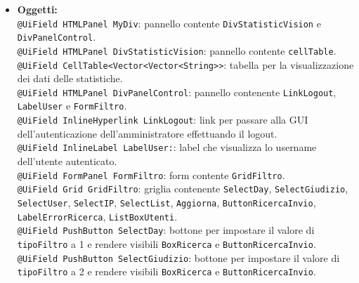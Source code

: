 {\begin{sloppypar}
{{{\begin{itemize}
					\texttt{- CellList<ContactInfo> cellList}: identifica l'oggetto che contiene la lista degli utenti registrati.\\
					
					\texttt{- String selected}: string che identifica l'utente attualmente selezionato.\\
				
				\item[] \textbf{Oggetti:}\\
					\texttt{@UiField HTMLPanel MyDiv}: pannello contente \texttt{DivStatisticVision} e \texttt{DivPanelControl}.\\

					\texttt{@UiField HTMLPanel DivStatisticVision}: pannello contente \texttt{cellTable}.\\

					\texttt{@UiField CellTable<Vector<Vector<String>>}: tabella per la visualizzazione dei dati delle statistiche.\\

					\texttt{@UiField HTMLPanel DivPanelControl}: pannello contenente \texttt{LinkLogout}, \texttt{LabelUser} e \texttt{FormFiltro}.\\

					\texttt{@UiField InlineHyperlink LinkLogout}: link per passare alla GUI\g~ dell'autenticazione dell'amministratore effettuando il logout.\\

					\texttt{@UiField InlineLabel LabelUser:}: label che visualizza lo username dell'utente autenticato.\\

					\texttt{@UiField FormPanel FormFiltro}: form contente \texttt{GridFiltro}.\\

					\texttt{@UiField Grid GridFiltro}: griglia contenente \texttt{SelectDay}, \texttt{SelectGiudizio}, \texttt{SelectUser}, \texttt{SelectIP}, \texttt{SelectList}, \texttt{Aggiorna}, \texttt{ButtonRicercaInvio}, \texttt{LabelErrorRicerca}, \texttt{ListBoxUtenti}.\\

					\texttt{@UiField PushButton SelectDay}: bottone per impostare il valore di \texttt{tipoFiltro} a 1 e rendere visibili \texttt{BoxRicerca} e \texttt{ButtonRicercaInvio}.\\

					\texttt{@UiField PushButton SelectGiudizio}: bottone per impostare il valore di \texttt{tipoFiltro} a 2 e rendere visibili \texttt{BoxRicerca} e \texttt{ButtonRicercaInvio}.\\


\end{itemize}}}}
\end{sloppypar}}
